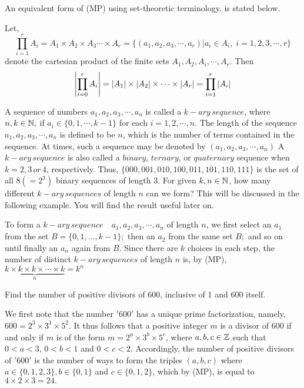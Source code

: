 \documentclass[a4paper,11pt]{book}
\begin{document}
An equivalent form of (MP) using set-theoretic terminology, is stated 
below. 
\begin{lemma}
Let,
\[ \prod_{i=1}^{r} A_{i} = A_{1} \times A_{2} \times A_{3} \cdots \times A_{r} = \{ (a_{1}, a_{2}, a_{3}, \cdots , a_{r}) |a_{i} \in A_{i},\; i = 1,2,3,\cdots, r\}       \]
 denote the cartesian product of the finite sets $A_{1}, A_{2}, A_{i},\cdots, A_{r}$. Then
 \[ \left\lvert \prod_{i=0}^{r} A_{i} \right\rvert = \left\lvert A_{1} \right\rvert \times \left\lvert A_{2} \right\rvert \times \cdots \times \left\lvert A_{r} \right\rvert = \prod_{i=1}^{r}\left\lvert A_{i} \right\rvert \]
\end{lemma}
A sequence of numbers $a_{1},a_{2},a_{3},\cdots,a_{n}$ is called a $k-ary\, sequence$, where $n, k \in \mathbb N,$ if $a_{i} \in \{0, 1, \cdots, k - 1\}$ for each $i = 1, 2, \cdots, n.$ The length of the sequence  $a_{1},a_{2},a_{3},\cdots,a_{n}$ is defined to be $n$, which is the number of terms contained in the sequence. At times, such a sequence may be denoted by $(a_{1},a_{2},a_{3},\cdots,a_{n})$ A $k-ary\, sequence$ is also called a $binary$, $ternary$, or $quaternary$ sequence when $k = 2, 3\, or\, 4$, respectively. Thus, $\{000, 001,010,100,011,101,110, 111\}$ is the set of all $8(= 2^3)$ binary sequences of length 3. For given $k, n \in \mathbb N$, how many different $k-ary\, sequences$ of length $n$ can we form? This will be discussed in the following example. You will find the result useful later on. 
\begin{example}
To form a $k-ary\, sequence \quad a_{1},a_{2},a_{3},\cdots,a_{n}$ of length $n$, we first select an $a_1$ from the set $B = \{0, 1, ..., k - 1\};$ then an $a_2$ from the same set $B;$ and so on until finally an $a_n$ again from $B$. Since there are $k$ choices in each step, the number of distinct $k-ary\, sequences$ of length $n$ is, by (MP), $\underbrace{k\times k \times k \times \cdots \times k}_{n} = k^{n}$
\end{example}
\begin{example}
Find the number of positive divisors of 600, inclusive of 1 and 600 itself. 
\end{example}
\begin{soln}
We first note that the number $'600'$ has a unique prime factorization, namely, $600 = 2^3 \times 3^1 \times 5^2.$ It thus follows that a positive 
integer $m$ is a divisor of $600$ if and only if $m$ is of the form $m = 2^{a} \times 3^{b}\times 5^{c} $, where $a, b, c \in \mathbb Z$ such that $0 < a < 3$, $0 < b < 1$ and $0 < c < 2$. Accordingly, the number of positive divisors of $'600'$ is the number of ways to form the 
triples $(a, b, c)$ where $a \in \{0, 1,2, 3\}, b \in \{0, 1\}$ and $c \in \{0, 1, 2\}$, which by (MP), is equal to $4 \times 2 \times 3 = 24.$ 
\end{soln}
\end{document}
